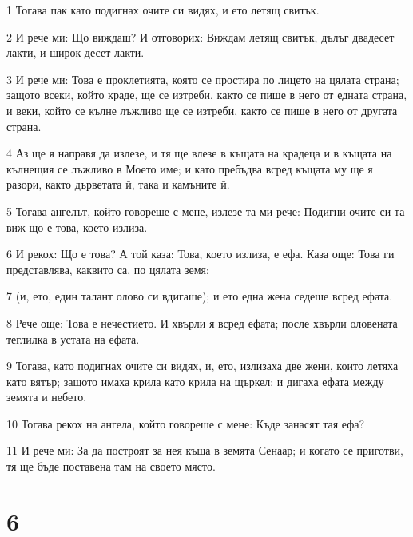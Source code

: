 \par 1 Тогава пак като подигнах очите си видях, и ето летящ свитък.
\par 2 И рече ми: Що виждаш? И отговорих: Виждам летящ свитък, дълъг двадесет лакти, и широк десет лакти.
\par 3 И рече ми: Това е проклетията, която се простира по лицето на цялата страна; защото всеки, който краде, ще се изтреби, както се пише в него от едната страна, и веки, който се кълне лъжливо ще се изтреби, както се пише в него от другата страна.
\par 4 Аз ще я направя да излезе, и тя ще влезе в къщата на крадеца и в къщата на кълнещия се лъжливо в Моето име; и като пребъдва всред къщата му ще я разори, както дърветата й, така и камъните й.
\par 5 Тогава ангелът, който говореше с мене, излезе та ми рече: Подигни очите си та виж що е това, което излиза.
\par 6 И рекох: Що е това? А той каза: Това, което излиза, е ефа. Каза още: Това ги представлява, каквито са, по цялата земя;
\par 7 (и, ето, един талант олово си вдигаше); и ето една жена седеше всред ефата.
\par 8 Рече още: Това е нечестието. И хвърли я всред ефата; после хвърли оловената теглилка в устата на ефата.
\par 9 Тогава, като подигнах очите си видях, и, ето, излизаха две жени, които летяха като вятър; защото имаха крила като крила на щъркел; и дигаха ефата между земята и небето.
\par 10 Тогава рекох на ангела, който говореше с мене: Къде занасят тая ефа?
\par 11 И рече ми: За да построят за нея къща в земята Сенаар; и когато се приготви, тя ще бъде поставена там на своето място.

\chapter{6}

